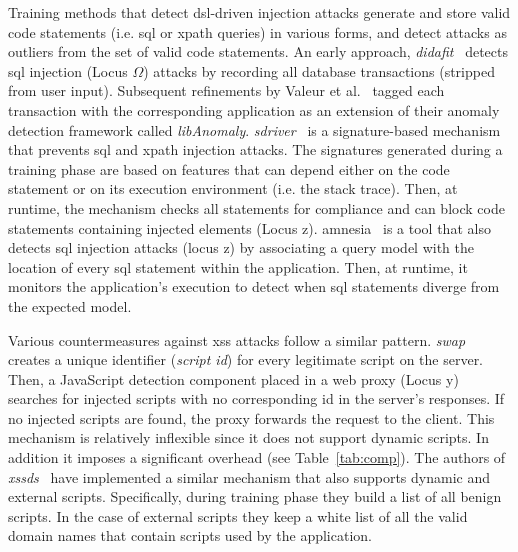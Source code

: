 \documentclass[conference]{IEEEtran}
\begin{document}
Training methods that detect {\sc dsl}-driven injection attacks
generate and store valid code statements (i.e. {\sc sql} or {\sc
  xp}ath queries) in various forms, and detect attacks as outliers
from the set of valid code statements. An early approach, {\it {\sc
    didafit}}~\cite{LLW02} detects {\sc sql} injection (Locus
$\Omega$) attacks by recording all database transactions
(stripped from user input). Subsequent
refinements by Valeur et al.~\cite{VMV05} tagged each transaction with
the corresponding application as an extension of their anomaly
detection framework called {\it libAnomaly}. {\it {\sc
    sd}river}~\cite{MS09,MKS09,MKLS11} is a signature-based mechanism
that prevents {\sc sql} and {\sc xp}ath injection attacks. The
signatures generated during a training phase are based on features
that can depend either on the code statement or on its execution
environment (i.e. the stack trace). Then, at runtime, the mechanism
checks all statements for compliance and can block code statements
containing injected elements (Locus {\sc z}). {\sc
  amnesia}~\cite{HO05,HO06,HO05b} is a tool that also detects {\sc
  sql} injection attacks (locus {\sc z}) by associating a query model
with the location of every {\sc sql} statement within the application.
Then, at runtime, it monitors the application's execution to detect
when {\sc sql} statements diverge from the expected model.

Various countermeasures against {\sc xss} attacks follow a similar
pattern. {\it {\sc swap}}~\cite{WPLKK09} creates a unique identifier
({\it script {\sc id}}) for every legitimate script on the server.
Then, a JavaScript detection component placed in a web proxy (Locus
{\sc y}) searches for injected scripts with no corresponding {\sc id}
in the server's responses. If no injected scripts are found, the proxy
forwards the request to the client. This mechanism is relatively
inflexible since it does not support dynamic scripts. In addition it
imposes a significant overhead (see Table~\ref{tab:comp}). The authors
of {\it {\sc xssds}}~\cite{JEP08} have implemented a similar mechanism
that also supports dynamic and external scripts. Specifically, during
training phase they build a list of all benign scripts. In the case of
external scripts they keep a white list of all the valid domain names
that contain scripts used by the application.
\end{document}
